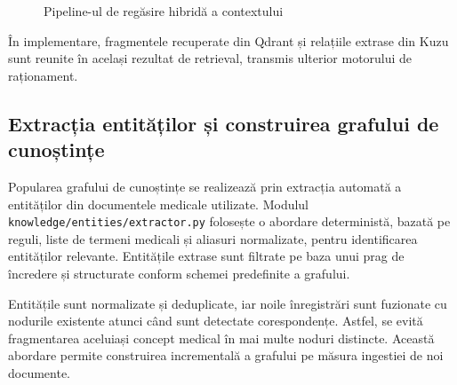 \documentclass[12pt, a4paper, oneside, romanian]{teza-upb}
\begin{document}
\begin{figure}[H]
\centering
{}
\caption{Pipeline-ul de regăsire hibridă a contextului}
\label{fig:rag-retrieval}
\end{figure}

În implementare, fragmentele recuperate din Qdrant și relațiile extrase din Kuzu sunt reunite în același rezultat de retrieval, transmis ulterior motorului de raționament.

\subsection{Extracția entităților și construirea grafului de cunoștințe}

Popularea grafului de cunoștințe se realizează prin extracția automată a entităților din documentele medicale utilizate. Modulul \texttt{knowledge/entities/extractor.py} folosește o abordare deterministă, bazată pe reguli, liste de termeni medicali și aliasuri normalizate, pentru identificarea entităților relevante. Entitățile extrase sunt filtrate pe baza unui prag de încredere și structurate conform schemei predefinite a grafului.

Entitățile sunt normalizate și deduplicate, iar noile înregistrări sunt fuzionate cu nodurile existente atunci când sunt detectate corespondențe. Astfel, se evită fragmentarea aceluiași concept medical în mai multe noduri distincte. Această abordare permite construirea incrementală a grafului pe măsura ingestiei de noi documente.
\end{document}
